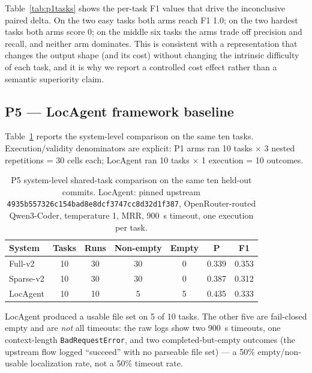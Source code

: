 Table~\ref{tab:p1tasks} shows the per-task F1 values that drive the
inconclusive paired delta. On the two easy tasks both arms reach F1 1.0; on
the two hardest tasks both arms score 0; on the middle six tasks the arms
trade off precision and recall, and neither arm dominates. This is consistent
with a representation that changes the output shape (and its cost) without
changing the intrinsic difficulty of each task, and it is why we report a
controlled cost effect rather than a semantic superiority claim.

\subsection{P5 — LocAgent framework baseline}
Table~\ref{tab:p5} reports the system-level comparison on the same ten tasks.
Execution/validity denominators are explicit: P1 arms ran 10 tasks $\times$ 3
nested repetitions = 30 cells each; LocAgent ran 10 tasks $\times$ 1 execution
= 10 outcomes.

\begin{table}[t]
\caption{P5 system-level shared-task comparison on the same ten held-out
commits. LocAgent: pinned upstream
\texttt{4935b557326c154bad8e8dcf3747cc8d32d1f387}, OpenRouter-routed
Qwen3-Coder, temperature 1, MRR, 900~s timeout, one execution per task.}
\label{tab:p5}
\centering
\scriptsize
\setlength{\tabcolsep}{3pt}
\begin{tabular}{lcccccc}
\toprule
\textbf{System} & \textbf{Tasks} & \textbf{Runs} & \textbf{Non-empty} &
\textbf{Empty} & \textbf{P} & \textbf{F1} \\
\midrule
Full-v2 & 10 & 30 & 30 & 0 & 0.339 & 0.353 \\
Sparse-v2 & 10 & 30 & 30 & 0 & 0.387 & 0.312 \\
LocAgent & 10 & 10 & 5 & 5 & 0.435 & 0.333 \\
\bottomrule
\end{tabular}
\end{table}

LocAgent produced a usable file set on 5 of 10 tasks. The other five are
fail-closed empty and are \emph{not} all timeouts: the raw logs show two 900~s
timeouts, one context-length \texttt{BadRequestError}, and two
completed-but-empty outcomes (the upstream flow logged ``succeed'' with no
parseable file set) --- a 50\% empty/non-usable localization rate, not a 50\%
timeout rate.

